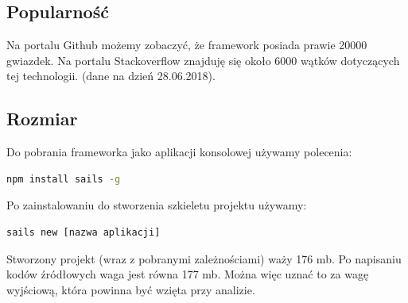 \documentclass[12pt]{report}
\begin{document}
    \subsection{Popularność}
      Na portalu Github możemy zobaczyć, że framework posiada prawie 20000 gwiazdek.
      Na portalu Stackoverflow znajduję się około 6000 wątków dotyczących tej technologii.
      (dane na dzień 28.06.2018).

    \subsection{Rozmiar}
      Do pobrania frameworka jako aplikacji konsolowej używamy polecenia:
      \begin{lstlisting}[language=bash,numbers=none]
        npm install sails -g
      \end{lstlisting}
      Po zainstalowaniu do stworzenia szkieletu projektu używamy:
      \begin{lstlisting}[language=bash,numbers=none]
        sails new [nazwa aplikacji]
      \end{lstlisting}
      Stworzony projekt (wraz z pobranymi zależnościami) waży 176 mb.
      Po napisaniu kodów źródłowych waga jest równa 177 mb.
      Można więc uznać to za wagę wyjściową, która powinna być wzięta przy analizie.
\end{document}

